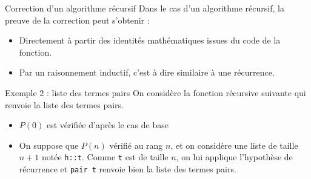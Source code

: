 \documentclass[10pt]{beamer}
\begin{document}
\begin{frame}[fragile]{\Ctitle}{\stitle}
    \begin{block}{Correction d'un algorithme récursif}
        Dans le cas d'un algorithme récursif, la preuve de la correction peut s'obtenir :
        \begin{itemize}
            \item<1-> Directement à partir des identités mathématiques issues du code de la fonction.
            \item<2-> Par un raisonnement inductif, c'est à dire similaire à une récurrence.
        \end{itemize}
    \end{block}
\end{frame}

\begin{frame}[fragile]{\Ctitle}{\stitle}
    \begin{exampleblock}{Exemple 2 : liste des termes pairs}
        {\small On considère la fonction récursive suivante qui renvoie la liste des termes pairs.}
        \begin{itemize}
            \item<5-> {\small $P(0)$ est vérifiée d'après le cas de base}
            \item<6-> {\small On suppose que $P(n)$ vérifié au rang $n$, et on considère une liste de taille $n+1$ notée {\tt h::t}. Comme  {\tt t} est de taille $n$, on lui applique l'hypothèse de récurrence et {\tt pair t} renvoie bien la liste des termes pairs.}
        \end{itemize}
    \end{exampleblock}
\end{frame}
\end{document}

